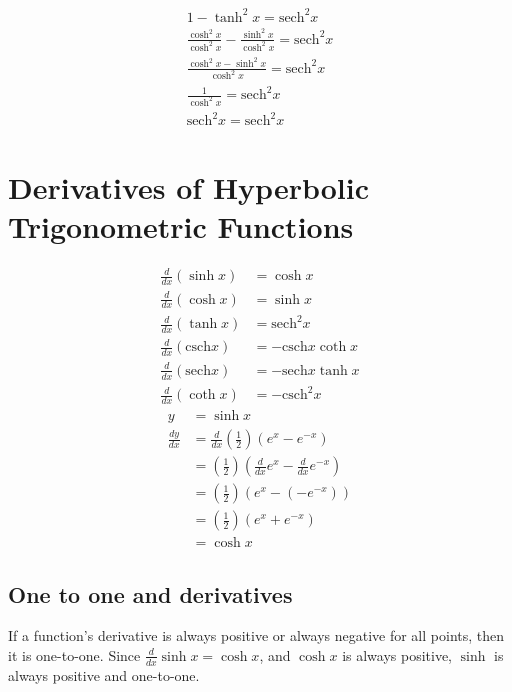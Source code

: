 \documentclass{article}
\theoremstyle{mytheoremstyle}
\theoremstyle{mytheoremstyle}
\theoremstyle{myproblemstyle}
\newcommand{\sech}{\text{sech}}
\newcommand{\csch}{\text{csch}}
\begin{document}
    \begin{align*}
        1 - \tanh^2 x = \sech^2x \\
        \frac{\cosh^2 x}{\cosh^2 x} - \frac{\sinh^2 x}{\cosh^2 x} = \sech^2x \\
        \frac{\cosh^2 x - \sinh^2 x}{\cosh^2 x} = \sech^2x \\
        \frac{1}{\cosh^2 x} = \sech^2x \\
        \sech^2 x = \sech^2 x
    \end{align*}

    \section*{Derivatives of Hyperbolic Trigonometric Functions}
    \begin{align*}
        \frac{d}{dx} (\sinh x) &= \cosh x \\
        \frac{d}{dx} (\cosh x) &= \sinh x \\
        \frac{d}{dx} (\tanh x) &= \sech^2 x \\
        \frac{d}{dx} (\csch x) &= -\csch x \coth x \\
        \frac{d}{dx} (\sech x) &= -\sech x \tanh x \\
        \frac{d}{dx} (\coth x) &= -\csch^2 x
    \end{align*}
    \begin{align*}
        y &= \sinh x \\
        \frac{dy}{dx} &= \frac{d}{dx} (\frac{1}{2})(e^x-e^{-x}) \\
             &=  (\frac{1}{2})(\frac{d}{dx} e^x - \frac{d}{dx} e^{-x}) \\
             &=  (\frac{1}{2})(e^x - (- e^{-x})) \\
             &=  (\frac{1}{2})(e^x + e^{-x}) \\
             &= \cosh x
    \end{align*}

    \subsection*{One to one and derivatives}
    If a function's derivative is always positive or always negative for all
    points, then it is one-to-one. Since $\frac{d}{dx} \sinh  x = \cosh x$, and
    $\cosh x$ is always positive, $\sinh$ is always positive and one-to-one.
\end{document}
